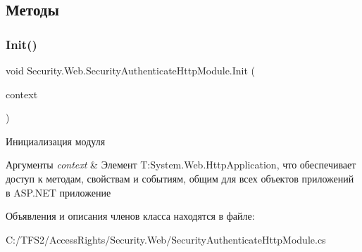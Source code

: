 \subsection{Методы}
\mbox{\label{class_security_1_1_web_1_1_security_authenticate_http_module_a7b068323235390535339e55136e658ec}} 
\subsubsection{\texorpdfstring{Init()}{Init()}}
{\footnotesize\ttfamily void Security.\+Web.\+Security\+Authenticate\+Http\+Module.\+Init (\begin{DoxyParamCaption}\item[{Http\+Application}]{context }\end{DoxyParamCaption})}



Инициализация модуля 


\begin{DoxyParams}{Аргументы}
{\em context} & Элемент T\+:\+System.\+Web.\+Http\+Application, что обеспечивает доступ к методам, свойствам и событиям, общим для всех объектов приложений в A\+S\+P.\+N\+ET приложение\\
\hline
\end{DoxyParams}


Объявления и описания членов класса находятся в файле\+:\begin{DoxyCompactItemize}
\item 
C\+:/\+T\+F\+S2/\+Access\+Rights/\+Security.\+Web/Security\+Authenticate\+Http\+Module.\+cs\end{DoxyCompactItemize}
